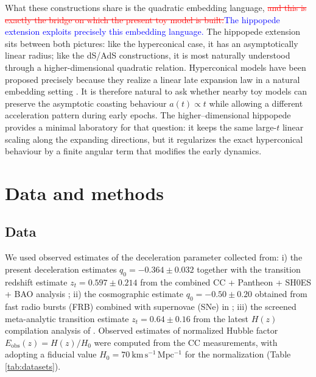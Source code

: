 \documentclass[preprint,12pt]{elsarticle}
\begin{document}
What these constructions share is the quadratic embedding language, \textcolor{red}{\sout{and this is exactly the bridge on which the present toy model is built.}}\textcolor{blue}{The hippopede extension exploits precisely this embedding language.} The hippopede extension sits between both pictures: like the hyperconical case, it has an asymptotically linear radius; like the dS/AdS constructions, it is most naturally understood through a higher-dimensional quadratic relation. Hyperconical models have been proposed precisely because they realize a linear late expansion law in a natural embedding setting \cite{monjo2017hyperconical}. It is therefore natural to ask whether nearby toy models can preserve the asymptotic coasting behaviour $a(t)\propto t$ while allowing a different acceleration pattern during early epochs. The higher--dimensional hippopede provides a minimal laboratory for that question: it keeps the same large-$t$ linear scaling along the expanding directions, but it regularizes the exact hyperconical behaviour by a finite angular term that modifies the early dynamics.




\section{Data and methods}\label{sec:methods}

\subsection{Data}

We used observed estimates of the deceleration parameter collected from: i) the present deceleration estimates $q_0=-0.364\pm0.032$ together with the transition redshift estimate $z_t=0.597\pm0.214$ from the combined CC + Pantheon + SH0ES + BAO analysis \cite{myrzakulov2025q0}; ii) the cosmographic estimate $q_0=-0.50\pm0.20$ obtained from fast radio bursts (FRB) combined with supernovae (SNe) in \cite{gao2024frb}; iii) the screened meta-analytic transition estimate $z_t=0.64\pm0.16$ from the latest $H(z)$ compilation analysis of \cite{hu2025transition}. Observed estimates of normalized Hubble factor $E_{\mathrm{obs}}(z)=H(z)/H_0$ were computed from the CC measurements, with adopting a fiducial value $H_0=70~\mathrm{km\,s^{-1}\,Mpc^{-1}}$ for the normalization (Table \ref{tab:datasets}).
\end{document}
